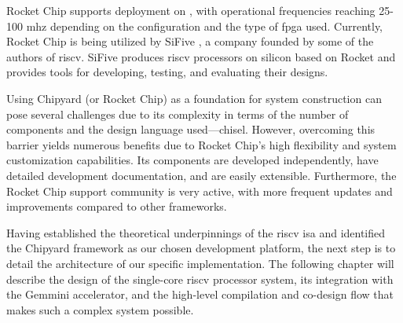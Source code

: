 Rocket Chip supports deployment on , with operational frequencies reaching 25-100 \acrshort{mhz} depending on the configuration and the type of \acrshort{fpga} used. Currently, Rocket Chip is being utilized by SiFive \cite{sifive2024portfolio}, a company founded by some of the authors of \acrshort{riscv}. SiFive produces \acrshort{riscv} processors on silicon based on Rocket and provides tools for developing, testing, and evaluating their designs.

Using Chipyard (or Rocket Chip) as a foundation for system construction can pose several challenges due to its complexity in terms of the number of components and the design language used—\acrshort{chisel}. However, overcoming this barrier yields numerous benefits due to Rocket Chip's high flexibility and system customization capabilities. Its components are developed independently, have detailed development documentation, and are easily extensible. Furthermore, the Rocket Chip support community is very active, with more frequent updates and improvements compared to other frameworks.

Having established the theoretical underpinnings of the \acrshort{riscv} \acrshort{isa} and identified the Chipyard framework as our chosen development platform, the next step is to detail the architecture of our specific implementation. The following chapter will describe the design of the single-core \acrshort{riscv} processor system, its integration with the Gemmini accelerator, and the high-level compilation and co-design flow that makes such a complex system possible.